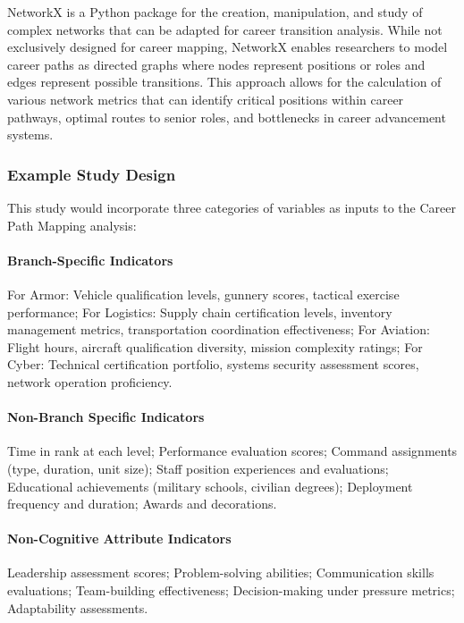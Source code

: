 \documentclass[../main.tex]{subfiles}
\begin{document}
NetworkX is a Python package for the creation, manipulation, and study of complex networks that can be adapted for career transition analysis. While not exclusively designed for career mapping, NetworkX enables researchers to model career paths as directed graphs where nodes represent positions or roles and edges represent possible transitions. This approach allows for the calculation of various network metrics that can identify critical positions within career pathways, optimal routes to senior roles, and bottlenecks in career advancement systems.

\subsubsection{Example Study Design}

This study would incorporate three categories of variables as inputs to the Career Path Mapping analysis:

\paragraph{Branch-Specific Indicators}
For Armor: Vehicle qualification levels, gunnery scores, tactical exercise performance; For Logistics: Supply chain certification levels, inventory management metrics, transportation coordination effectiveness; For Aviation: Flight hours, aircraft qualification diversity, mission complexity ratings; For Cyber: Technical certification portfolio, systems security assessment scores, network operation proficiency.

\paragraph{Non-Branch Specific Indicators}
Time in rank at each level; Performance evaluation scores; Command assignments (type, duration, unit size); Staff position experiences and evaluations; Educational achievements (military schools, civilian degrees); Deployment frequency and duration; Awards and decorations.

\paragraph{Non-Cognitive Attribute Indicators}
Leadership assessment scores; Problem-solving abilities; Communication skills evaluations; Team-building effectiveness; Decision-making under pressure metrics; Adaptability assessments.
\end{document}
